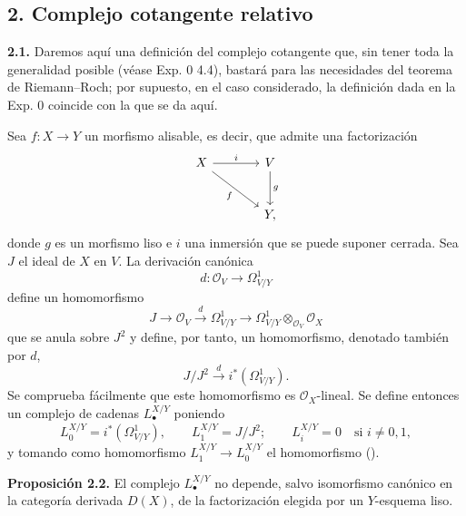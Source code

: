 
\subsection*{2. Complejo cotangente relativo}

\textbf{2.1.} Daremos aquí una definición del complejo cotangente que, sin
tener toda la generalidad posible (véase Exp. 0 4.4), bastará para las
necesidades del teorema de Riemann--Roch; por supuesto, en el caso considerado,
la definición dada en la Exp. 0 coincide con la que se da aquí.

Sea $f:X\to Y$ un morfismo alisable, es decir, que admite una factorización
\[
\begin{tikzcd}[column sep=large,row sep=large]
X \arrow[r,"i"] \arrow[dr,"f"'] & V \arrow[d,"g"]\\
& Y,
\end{tikzcd}
\]
donde $g$ es un morfismo liso e $i$ una inmersión que se puede suponer cerrada.
Sea $J$ el ideal de $X$ en $V$. La derivación canónica
\[
d:\mathcal O_V\longrightarrow\Omega^1_{V/Y}
\]
define un homomorfismo
\[
J\longrightarrow\mathcal O_V\xrightarrow{d}\Omega^1_{V/Y}\longrightarrow
\Omega^1_{V/Y}\otimes_{\mathcal O_V}\mathcal O_X
\]
que se anula sobre $J^2$ y define, por tanto, un homomorfismo, denotado también
por $d$,
\begin{equation}\tag{2.1.1}
J/J^2\xrightarrow{d} i^*(\Omega^1_{V/Y}).
\end{equation}
Se comprueba fácilmente que este homomorfismo es $\mathcal O_X$-lineal. Se
define entonces un complejo de cadenas $L^{X/Y}_\bullet$ poniendo
\[
L^{X/Y}_0=i^*(\Omega^1_{V/Y}),\qquad
L^{X/Y}_1=J/J^2;
\qquad
L^{X/Y}_i=0\quad\text{si }i\neq0,1,
\]
y tomando como homomorfismo $L^{X/Y}_1\to L^{X/Y}_0$ el homomorfismo (). %

\textbf{Proposición 2.2.} El complejo $L^{X/Y}_\bullet$ no depende, salvo
isomorfismo canónico en la categoría derivada $D(X)$, de la factorización
elegida por un $Y$-esquema liso.


